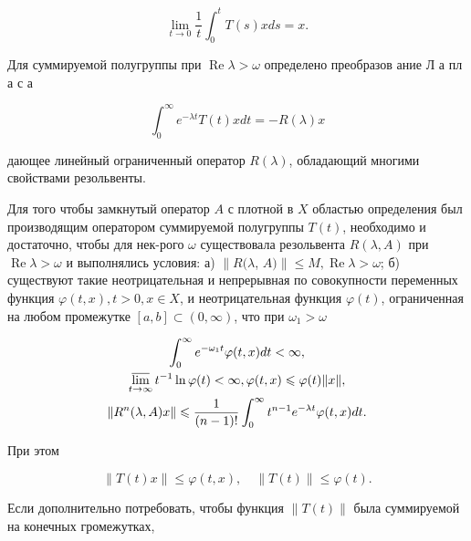 \documentclass[10pt]{article}
\begin{document}
\[

\lim _{t \rightarrow 0} \frac{1}{t} \int_{0}^{t} T(s) x d s=x .

\]



Для суммируемой полугруппы при $\operatorname{Re} \lambda>\omega$ определено преобразов ание Л а пл а с а



\[

\int_{0}^{\infty} e^{-\lambda t} T(t) x d t=-R(\lambda) x

\]



дающее линейный ограниченный оператор $R(\lambda)$, обладающий многими свойствами резольвенты.



Для того чтобы замкнутый оператор $A$ с плотной в $X$ областью определения был производящим оператором суммируемой полугруппы $T(t)$, необходимо и достаточно, чтобы для нек-рого $\omega$ существовала резольвента $R(\lambda, A)$ при $\operatorname{Re} \lambda>\omega$ и выполнялись условия: а) $\| R(\lambda$, $A) \| \leqslant M, \operatorname{Re} \lambda>\omega$; б) существуют такие неотрицательная и непрерывная по совокупности переменных функция $\varphi(t, x), t>0, x \in X$, и неотрицательная функция $\varphi(t)$, ограниченная на любом промежутке $[a, b] \subset(0, \infty)$, что при $\omega_{1}>\omega$



\[

\begin{gathered}

\int_{0}^{\infty} e^{-\omega_{1} t} \varphi(t, x) d t<\infty, \\

\varlimsup_{t \rightarrow \infty} t^{-1} \ln \varphi(t)<\infty, \varphi(t, x) \leqslant \varphi(t)\|x\|, \\

\left\|R^{n}(\lambda, A) x\right\| \leqslant \frac{1}{(n-1) !} \int_{0}^{\infty} t^{n-1} e^{-\lambda t} \varphi(t, x) d t .

\end{gathered}

\]



При этом



\[

\|T(t) x\| \leqslant \varphi(t, x), \quad\|T(t)\| \leqslant \varphi(t) .

\]



Если дополнительно потребовать, чтобы функция $\|T(t)\|$ была суммируемой на конечных громежутках,
\end{document}
